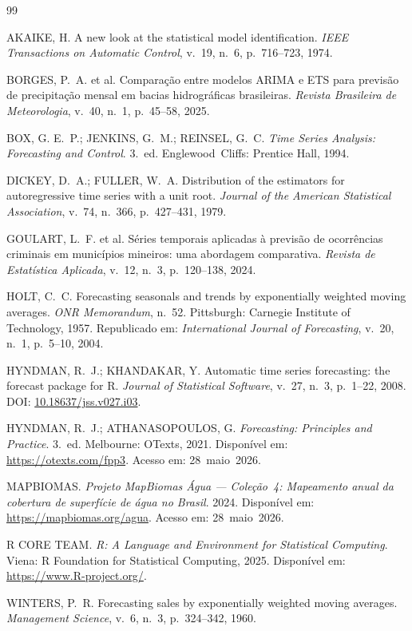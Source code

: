 \documentclass[12pt, a4paper]{article}
\begin{document}
\newpage
\renewcommand{\refname}{Referências}
\begin{thebibliography}{99}
\singlespacing
\small

AKAIKE, H. A new look at the statistical model identification.
\textit{IEEE Transactions on Automatic Control}, v.~19, n.~6,
p.~716--723, 1974.

BORGES, P.~A. et al. Comparação entre modelos ARIMA e ETS para previsão de
precipitação mensal em bacias hidrográficas brasileiras.
\textit{Revista Brasileira de Meteorologia}, v.~40, n.~1, p.~45--58, 2025.

BOX, G. E.~P.; JENKINS, G.~M.; REINSEL, G.~C.
\textit{Time Series Analysis: Forecasting and Control}. 3.~ed.
Englewood~Cliffs: Prentice Hall, 1994.

DICKEY, D.~A.; FULLER, W.~A. Distribution of the estimators for autoregressive
time series with a unit root. \textit{Journal of the American Statistical
Association}, v.~74, n.~366, p.~427--431, 1979.

GOULART, L.~F. et al. Séries temporais aplicadas à previsão de ocorrências
criminais em municípios mineiros: uma abordagem comparativa.
\textit{Revista de Estatística Aplicada}, v.~12, n.~3, p.~120--138, 2024.

HOLT, C.~C. Forecasting seasonals and trends by exponentially weighted moving
averages. \textit{ONR Memorandum}, n.~52. Pittsburgh: Carnegie Institute of
Technology, 1957. Republicado em: \textit{International Journal of
Forecasting}, v.~20, n.~1, p.~5--10, 2004.

HYNDMAN, R.~J.; KHANDAKAR, Y. Automatic time series forecasting: the forecast
package for R. \textit{Journal of Statistical Software}, v.~27, n.~3,
p.~1--22, 2008. DOI: \url{10.18637/jss.v027.i03}.

HYNDMAN, R.~J.; ATHANASOPOULOS, G. \textit{Forecasting: Principles and
Practice}. 3.~ed. Melbourne: OTexts, 2021. Disponível em:
\url{https://otexts.com/fpp3}. Acesso em: 28~maio~2026.

MAPBIOMAS. \textit{Projeto MapBiomas Água --- Coleção~4: Mapeamento anual da
cobertura de superfície de água no Brasil}. 2024. Disponível em:
\url{https://mapbiomas.org/agua}. Acesso em: 28~maio~2026.

R CORE TEAM. \textit{R: A Language and Environment for Statistical Computing}.
Viena: R Foundation for Statistical Computing, 2025. Disponível em:
\url{https://www.R-project.org/}.

WINTERS, P.~R. Forecasting sales by exponentially weighted moving averages.
\textit{Management Science}, v.~6, n.~3, p.~324--342, 1960.

\end{thebibliography}
\end{document}
